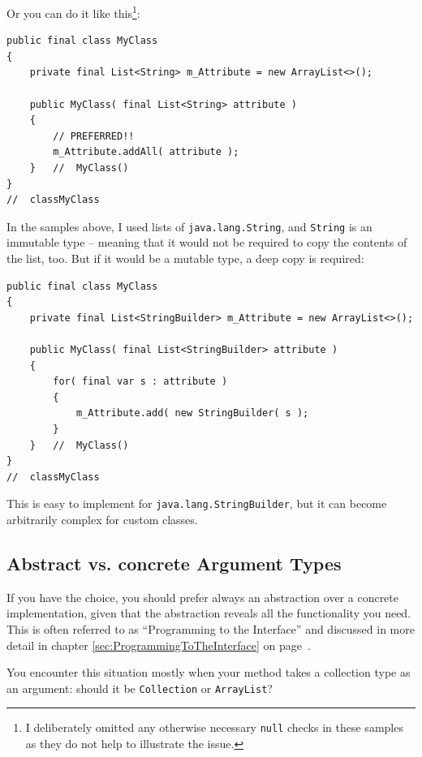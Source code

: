 \documentclass[11pt,a4paper, titlepage, parskip=half, headsepline, footsepline, cleardoublepage=current, headheight=1cm]{scrbook}
\newcommand*{\tqvref}[1]{\hyperref[{#1}]{\ref*{#1}} on page~\pageref{#1}}
\begin{document}
Or you can do it like this\footnote{I deliberately omitted any otherwise necessary \lstinline|null| checks in these samples as they do not help to illustrate the issue.}:
\begin{lstlisting}
public final class MyClass
{
    private final List<String> m_Attribute = new ArrayList<>();
    
    public MyClass( final List<String> attribute )
    {
        // PREFERRED!!
        m_Attribute.addAll( attribute );
    }   //  MyClass()
}
//  classMyClass
\end{lstlisting}
In the samples above, I used lists of \lstinline|java.lang.String|, and \lstinline|String| is an immutable type – meaning that it would not be required to copy the contents of the list, too. But if it would be a mutable type, a deep copy is required:
\begin{lstlisting}
public final class MyClass
{
    private final List<StringBuilder> m_Attribute = new ArrayList<>();
    
    public MyClass( final List<StringBuilder> attribute )
    {
        for( final var s : attribute )
        {
            m_Attribute.add( new StringBuilder( s );
        }    	
    }   //  MyClass()
}
//  classMyClass
\end{lstlisting}
This is easy to implement for \lstinline|java.lang.StringBuilder|, but it can become arbitrarily complex for custom classes.


\subsection{Abstract vs. concrete Argument Types}\label{sec:ArgumentTypes}
If you have the choice, you should prefer always an abstraction over a concrete implementation, given that the abstraction reveals all the functionality you need. This is often referred to as “Programming to the Interface” and discussed in more detail in chapter \tqvref{sec:ProgrammingToTheInterface}.

You encounter this situation mostly when your method takes a collection type as an argument: should it be \lstinline|Collection|\autocite{ORACLE_DOC_COLLECTION_INTERFACE} or \lstinline|ArrayList|\autocite{ORACLE_DOC_ARRAYLIST_CLASS}?
\end{document}
